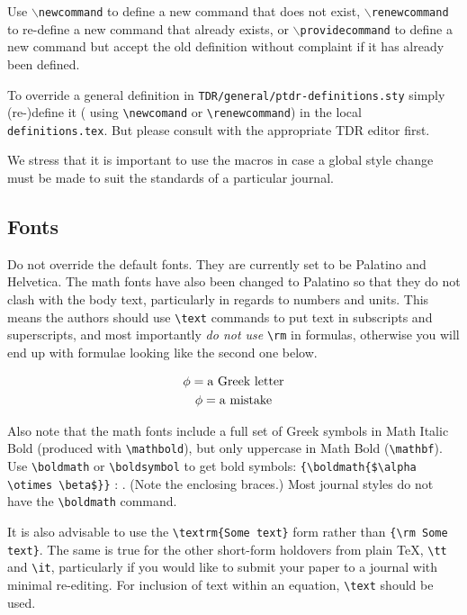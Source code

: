 Use {$\backslash$\texttt{newcommand}} to define a new command that does not exist,
{$\backslash$\texttt{renewcommand}} to re-define a new command that already exists,
or {$\backslash$\texttt{providecommand}} to define a new command but accept the old
definition without complaint if it has already been defined.

To override a general definition in \texttt{TDR/general/ptdr-definitions.sty}
simply (re-)define it ( using \verb|\newcomand| or \verb|\renewcommand|) in the local \texttt{definitions.tex}. But please
consult with the appropriate TDR editor first.

We stress that it is important to use the macros in case a global style change must be made to suit the standards of a particular journal.

\subsection{Fonts}
Do not override the default fonts. They are currently set to be
Palatino and Helvetica. The math fonts have also been changed to
Palatino so that they do not clash with the body text,
particularly in regards to numbers and units. This means the
authors should use \verb|\text| commands to put text in subscripts
and superscripts, and most importantly \emph{do not use}
\verb|\rm| in formulas, otherwise you will end up with formulae looking like the second one below.

\begin{gather}
\phi = \text{a Greek letter}\\
{\rm \phi} = \text{a mistake}
\end{gather}

Also note that the math fonts include a full set of Greek symbols in Math Italic Bold (produced with \verb|\mathbold|),
but only uppercase in Math Bold (\verb|\mathbf|). Use \verb|\boldmath| or \verb|\boldsymbol| to get bold symbols: \verb|{\boldmath{$\alpha \otimes \beta$}}| : {\boldmath{$\alpha \otimes \beta$}}. (Note the enclosing braces.) Most journal styles do not have the \verb|\boldmath| command.



It is also advisable to use the \verb|\textrm{Some text}| form rather than
\verb|{\rm Some text}|. The same is true for the other short-form holdovers from plain \TeX,
\verb|\tt| and \verb|\it|, particularly if you would like to submit your paper to a journal
with minimal re-editing. For inclusion of text within an equation, \verb|\text| should be used.

